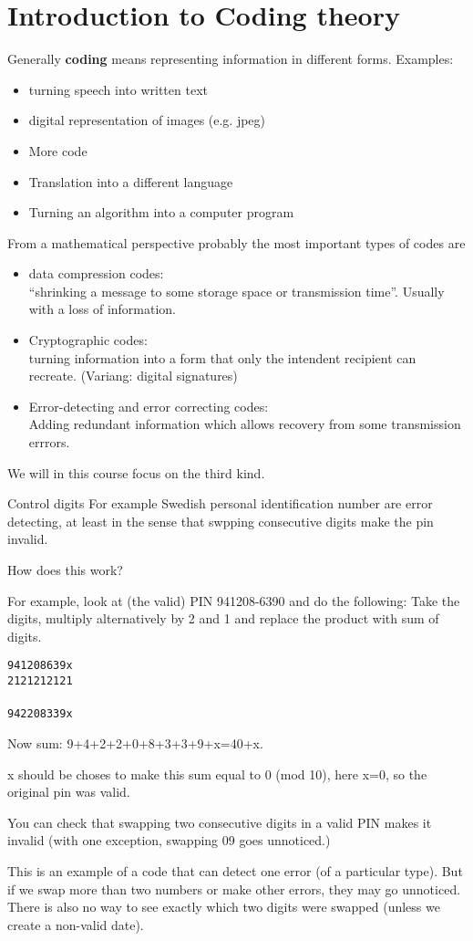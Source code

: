 \documentclass[english]{lbscript}
\begin{document}
\section{Introduction to Coding theory}
\label{sec:coding-theory}

Generally \textbf{coding} means representing information in different forms. Examples:
\begin{itemize}
	\item turning speech into written text
	\item digital representation of images (e.g. jpeg)
	\item More code
	\item Translation into a different language
	\item Turning an algorithm into a computer program
\end{itemize}

From a mathematical perspective probably the most important types of codes are
\begin{itemize}
	\item data compression codes: \\
	      \enquote{shrinking a message to some storage space or transmission time}. Usually with a loss of information.
	\item Cryptographic codes:\\ turning information into a form that only the intendent recipient can recreate. (Variang: digital signatures)
	\item Error-detecting and error correcting codes:\\
	      Adding redundant information which allows recovery from some transmission errrors.
\end{itemize}
We will in this course focus on the third kind.

\begin{example}{Control digits}{}
	For example Swedish personal identification number are error detecting, at least in the sense that swpping consecutive digits make the pin invalid.

	How does this work?

	For example, look at (the valid) PIN 941208-6390 and do the following:
	Take the digits, multiply alternatively by 2 and 1 and replace the product with sum of digits.

	\texttt{941208639x}\\
	\texttt{2121212121}\\\\
	\texttt{942208339x}

	Now sum: 9+4+2+2+0+8+3+3+9+x=40+x.

	x should be choses to make this sum equal to 0 (mod 10), here x=0, so the original pin was valid.

	You can check that swapping two consecutive digits in a valid PIN makes it invalid (with one exception, swapping 09 goes unnoticed.)

	This is an example of a code that can detect one error (of a particular type). But if we swap more than two numbers or make other errors, they may go unnoticed. There is also no way to see exactly which two digits were swapped (unless we create a non-valid date).
\end{example}
\end{document}
